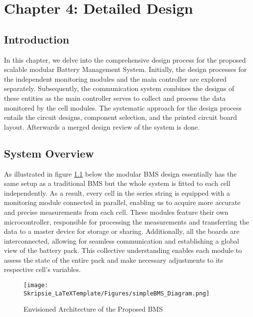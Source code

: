 \chapter[Detailed Design]{Chapter 4: Detailed Design}\label{chap:hard_dsgn}%
\section{Introduction}\label{sec:intro_dsgn}
In this chapter, we delve into the comprehensive design process for the proposed scalable modular Battery Management System. Initially, the design processes for the independent monitoring modules and the main controller are explored separately. Subsequently, the communication system combines the designs of these entities as the main controller serves to collect and process the data monitored by the cell modules. The systematic approach for the design process entails the circuit designs, component selection, and the printed circuit board layout. Afterwards a merged design review of the system is done.
\section{System Overview}\label{subsec:syst_OVV}
As illustrated in figure \ref{fig:ovvv_dsgn} below the modular BMS design essentially has the same setup as a traditional BMS but the whole system is fitted to each cell independently. As a result, every cell in the series string is equipped with a monitoring module connected in parallel, enabling us to acquire more accurate and precise measurements from each cell. These modules feature their own microcontroller, responsible for processing the measurements and transferring the data to a master device for storage or sharing. Additionally, all the boards are interconnected, allowing for seamless communication and establishing a global view of the battery pack. This collective understanding enables each module to assess the state of the entire pack and make necessary adjustments to its respective cell’s variables.

\begin{figure}[h!]
\centering
\texttt{[image: Skripsie\_LaTeXTemplate/Figures/simpleBMS\_Diagram.png]}
\caption{Envisioned Architecture of the Proposed BMS}
\label{fig:ovvv_dsgn}
\end{figure}


